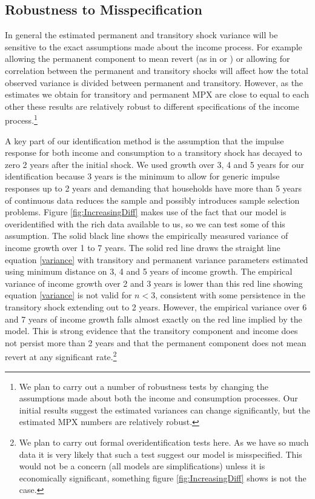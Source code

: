 \documentclass[titlepage]{\econtex}\newcommand{\texname}{IncomeUncertainty}
\begin{document}
\subsection{Robustness to Misspecification} \label{misspecification}
In general the estimated permanent and transitory shock variance will be sensitive to the exact assumptions made about the income process. For example allowing the permanent component to mean revert (as in \cite{ahn_when_2017} or \cite{arellano_earnings_2017}) or allowing for correlation between the permanent and transitory shocks will affect how the total observed variance is divided between permanent and transitory. However, as the estimates we obtain for transitory and permanent MPX are close to equal to each other these results are relatively robust to different specifications of the income process.\footnote{We plan to carry out a number of robustness tests by changing the assumptions made about both the income and consumption processes. Our initial results suggest the estimated variances can change significantly, but the estimated MPX numbers are relatively robust.}

A key part of our identification method is the assumption that the impulse response for both income and consumption to a transitory shock has decayed to zero 2 years after the initial shock. We used growth over 3, 4 and 5 years for our identification because 3 years is the minimum to allow for generic impulse responses up to 2 years and demanding that households have more than 5 years of continuous data reduces the sample and possibly introduces sample selection problems. Figure \ref{fig:IncreasingDiff} makes use of the fact that our model is overidentified with the rich data available to us, so we can test some of this assumption. The solid black line shows the empirically measured variance of income growth over 1 to 7 years. The solid red line draws the straight line equation \ref{variance} with transitory and permanent variance parameters estimated using minimum distance on 3, 4 and 5 years of income growth. The empirical variance of income growth over 2 and 3 years is lower than this red line showing equation \ref{variance} is not valid for $n < 3$, consistent with some persistence in the transitory shock extending out to 2 years. However, the empirical variance over 6 and 7 years of income growth falls almost exactly on the red line implied by the model. This is strong evidence that the transitory component and income does not persist more than 2 years and that the permanent component does not mean revert at any significant rate.\footnote{We plan to carry out formal overidentification tests here. As we have so much data it is very likely that such a test suggest our model is misspecified. This would not be a concern (all models are simplifications) unless it is economically significant, something figure \ref{fig:IncreasingDiff} shows is not the case.}
\end{document}
